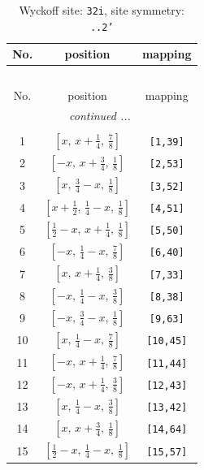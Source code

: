 \documentclass[fleqn,8pt]{jsarticle}
\begin{document}
\begin{longtable}{ccc}
\caption{Wyckoff site: {\tt 32i}, site symmetry: {\tt ..2'}}
 \\
 \hline \hline
No. & position & mapping \\ \hline \endfirsthead

\multicolumn{2}{l}{\tablename\ \thetable{}} \\
 \hline \hline
No. & position & mapping \\ \hline \endhead

 \hline \hline
\multicolumn{2}{r}{\footnotesize\it continued ...} \\ \endfoot

 \hline \hline
\multicolumn{2}{r}{} \\ \endlastfoot

1 & $\left[ x,\, x + \frac{1}{4},\, \frac{7}{8} \right]$ & {\tt [1,39]} \\ \hline
2 & $\left[ - x,\, x + \frac{3}{4},\, \frac{1}{8} \right]$ & {\tt [2,53]} \\ \hline
3 & $\left[ x,\, \frac{3}{4} - x,\, \frac{1}{8} \right]$ & {\tt [3,52]} \\ \hline
4 & $\left[ x + \frac{1}{2},\, \frac{1}{4} - x,\, \frac{1}{8} \right]$ & {\tt [4,51]} \\ \hline
5 & $\left[ \frac{1}{2} - x,\, x + \frac{1}{4},\, \frac{1}{8} \right]$ & {\tt [5,50]} \\ \hline
6 & $\left[ - x,\, \frac{1}{4} - x,\, \frac{7}{8} \right]$ & {\tt [6,40]} \\ \hline
7 & $\left[ x,\, x + \frac{1}{4},\, \frac{3}{8} \right]$ & {\tt [7,33]} \\ \hline
8 & $\left[ - x,\, \frac{1}{4} - x,\, \frac{3}{8} \right]$ & {\tt [8,38]} \\ \hline
9 & $\left[ - x,\, \frac{3}{4} - x,\, \frac{1}{8} \right]$ & {\tt [9,63]} \\ \hline
10 & $\left[ x,\, \frac{1}{4} - x,\, \frac{7}{8} \right]$ & {\tt [10,45]} \\ \hline
11 & $\left[ - x,\, x + \frac{1}{4},\, \frac{7}{8} \right]$ & {\tt [11,44]} \\ \hline
12 & $\left[ - x,\, x + \frac{1}{4},\, \frac{3}{8} \right]$ & {\tt [12,43]} \\ \hline
13 & $\left[ x,\, \frac{1}{4} - x,\, \frac{3}{8} \right]$ & {\tt [13,42]} \\ \hline
14 & $\left[ x,\, x + \frac{3}{4},\, \frac{1}{8} \right]$ & {\tt [14,64]} \\ \hline
15 & $\left[ \frac{1}{2} - x,\, \frac{1}{4} - x,\, \frac{1}{8} \right]$ & {\tt [15,57]} \\ \hline

\end{longtable}
\end{document}
